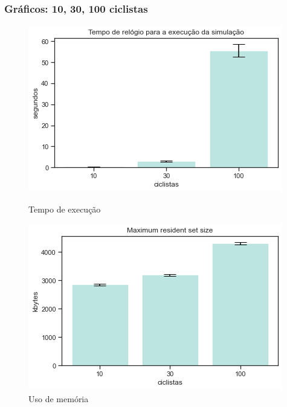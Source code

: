\documentclass{beamer}
\begin{document}
\begin{frame}
\frametitle{Gráficos: 10, 30, 100 ciclistas}


\begin{figure}[!htb]
  \includegraphics[width=\linewidth]{imgs/ciclistas_tempo}
  \caption{Tempo de execução}\label{fig:awesome_image1}
\endminipage\hfill
{}
  \includegraphics[width=\linewidth]{imgs/ciclistas_memoria}
  \caption{Uso de memória}\label{fig:awesome_image2}
  \endminipage\hfill
\end{figure}

\end{frame}
\end{document}
